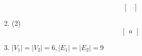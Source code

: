 \documentclass[12pt, A4]{article}
\newcommand{\enumset}[1]{\setcounter{enumi}{#1}}
\begin{document}
\begin{enumerate}
\begin{tasks}
\[\begin{bmatrix}
							\end{bmatrix}\]
					\end{tasks}
				\item
					\begin{tasks}(2)
						\task
							\[\begin{bmatrix}
								a
							\end{bmatrix}\]
					\end{tasks}
			
				\enumset{42}
				\item
					\(|V_1| = |V_2| =  6, |E_1| = |E_2|= 9\)
			\end{enumerate}
\end{document}
